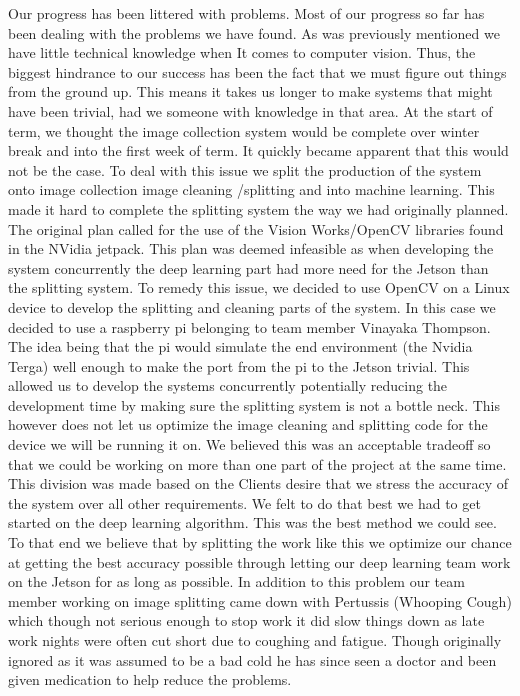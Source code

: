 \documentclass[onecolumn, draftclsnofoot,10pt, compsoc]{IEEEtran}
\begin{document}
Our progress has been littered with problems. Most of our progress so far has been dealing with the problems we have found.  As was previously mentioned we have little technical knowledge when It comes to computer vision. Thus, the biggest hindrance to our success has been the fact that we must figure out things from the ground up. This means it takes us longer to make systems that might have been trivial, had we someone with knowledge in that area. At the start of term, we thought the image collection system would be complete over winter break and into the first week of term. It quickly became apparent that this would not be the case. To deal with this issue we split the production of the system onto image collection image cleaning /splitting and into machine learning. This made it hard to complete the splitting system the way we had originally planned. The original plan called for the use of the Vision Works/OpenCV libraries found in the NVidia jetpack. This plan was deemed infeasible as when developing the system concurrently the deep learning part had more need for the Jetson than the splitting system. To remedy this issue, we decided to use OpenCV on a Linux device to develop the splitting and cleaning parts of the system. In this case we decided to use a raspberry pi belonging to team member Vinayaka Thompson. The idea being that the pi would simulate the end environment (the Nvidia Terga) well enough to make the port from the pi to the Jetson trivial. This allowed us to develop the systems concurrently potentially reducing the development time by making sure the splitting system is not a bottle neck. This however does not let us optimize the image cleaning and splitting code for the device we will be running it on. We believed this was an acceptable tradeoff so that we could be working on more than one part of the project at the same time. This division was made based on the Clients desire that we stress the accuracy of the system over all other requirements. We felt to do that best we had to get started on the deep learning algorithm. This was the best method we could see. To 
that end we believe that by splitting the work like this we optimize our chance at getting the best accuracy possible through letting our deep learning team work on the Jetson for as long as possible. 
In addition to this problem our team member working on image splitting came down with Pertussis (Whooping Cough) which though not serious enough to stop work it did slow things down as late work nights were often cut short due to coughing and fatigue. Though originally ignored as it was assumed to be a bad cold he has since seen a doctor and been given medication to help reduce the problems. 
\end{document}
